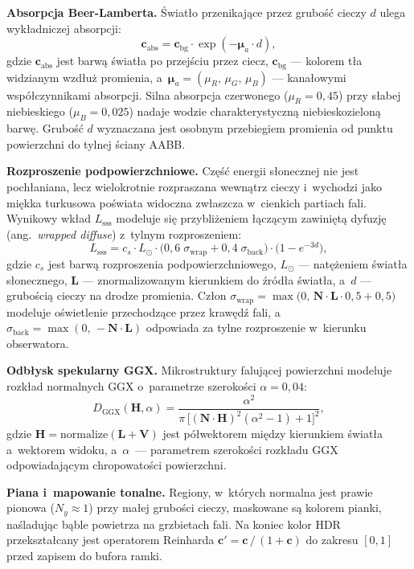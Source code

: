 \textbf{Absorpcja Beer-Lamberta.} Światło przenikające przez grubość cieczy $d$
ulega wykładniczej absorpcji:
\begin{equation}
    \mathbf{c}_{\mathrm{abs}} = \mathbf{c}_{\mathrm{bg}} \cdot
    \exp(-\boldsymbol{\mu}_a \cdot d),
\end{equation}
gdzie $\mathbf{c}_{\mathrm{abs}}$ jest barwą światła po przejściu przez ciecz, $\mathbf{c}_{\mathrm{bg}}$ --- kolorem tła widzianym wzdłuż promienia, a~$\boldsymbol{\mu}_a = (\mu_R,\, \mu_G,\, \mu_B)$ --- kanałowymi współczynnikami
absorpcji. Silna absorpcja czerwonego ($\mu_R = 0{,}45$) przy słabej niebieskiego
($\mu_B = 0{,}025$) nadaje wodzie charakterystyczną niebieskozieloną barwę.
Grubość $d$ wyznaczana jest osobnym przebiegiem promienia od punktu powierzchni
do tylnej ściany AABB.

\textbf{Rozproszenie podpowierzchniowe.} Część energii słonecznej nie jest
pochłaniana, lecz wielokrotnie rozpraszana wewnątrz cieczy i~wychodzi jako miękka
turkusowa poświata widoczna zwłaszcza w~cienkich partiach fali. Wynikowy wkład $L_{\mathrm{sss}}$ modeluje się
przybliżeniem łączącym zawiniętą dyfuzję (ang.~\textit{wrapped diffuse}) z~tylnym
rozproszeniem:
\begin{equation}
    L_{\mathrm{sss}} = c_s \cdot L_{\odot} \cdot
    \bigl(0{,}6\;\sigma_{\mathrm{wrap}} + 0{,}4\;\sigma_{\mathrm{back}}\bigr)
    \cdot \bigl(1 - e^{-3d}\bigr),
\end{equation}
gdzie $c_s$ jest barwą rozproszenia podpowierzchniowego, $L_{\odot}$ --- natężeniem światła słonecznego,
$\mathbf{L}$ --- znormalizowanym kierunkiem do źródła światła, a~$d$ --- grubością cieczy na drodze promienia.
Człon $\sigma_{\mathrm{wrap}} = \max\bigl(0,\,\mathbf{N}{\cdot}\mathbf{L}\cdot0{,}5+0{,}5\bigr)$
modeluje oświetlenie przechodzące przez krawędź fali, a~$\sigma_{\mathrm{back}} =
\max(0,\,-\mathbf{N}{\cdot}\mathbf{L})$ odpowiada za tylne rozproszenie w~kierunku
obserwatora.

\textbf{Odbłysk spekularny GGX.} Mikrostruktury falującej powierzchni modeluje
rozkład normalnych GGX \cite{walter2007microfacet} o~parametrze szerokości $\alpha = 0{,}04$:
\begin{equation}
    D_{\mathrm{GGX}}(\mathbf{H}, \alpha) =
    \frac{\alpha^2}{\pi\,\bigl[(\mathbf{N}{\cdot}\mathbf{H})^2(\alpha^2-1)+1\bigr]^2},
\end{equation}
gdzie $\mathbf{H} = \mathrm{normalize}(\mathbf{L} + \mathbf{V})$ jest półwektorem
między kierunkiem światła a~wektorem widoku, a~$\alpha$~--- parametrem szerokości
rozkładu GGX odpowiadającym chropowatości powierzchni.

\textbf{Piana i~mapowanie tonalne.} Regiony, w~których normalna jest prawie pionowa
($N_y \approx 1$) przy małej grubości cieczy, maskowane są kolorem pianki,
naśladując bąble powietrza na grzbietach fali. Na koniec kolor HDR przekształcany
jest operatorem Reinharda \cite{reinhard2002photographic}
$\mathbf{c}' = \mathbf{c}\,/\,(1+\mathbf{c})$ do zakresu $[0,1]$ przed zapisem
do bufora ramki.
